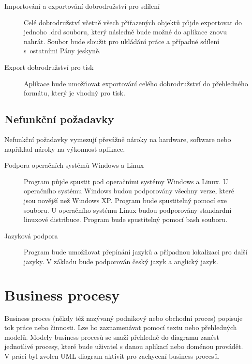 \documentclass[thesis=B,czech]{resources/FITthesis}[2012/06/26]
\begin{document}
\begin{description}
\item[Importování a exportování dobrodružství pro sdílení] Celé dobrodružství včetně všech přiřazených objektů půjde exportovat do jednoho .drd souboru, který následně bude možné do aplikace znovu nahrát. Soubor bude sloužit pro ukládání práce a případné sdílení s~ostatními Pány jeskyně.

\item[Export dobrodružství pro tisk] Aplikace bude umožňovat exportování celého dobrodružství do přehledného formátu, který je vhodný pro tisk. 
\end{description}

\subsection{Nefunkční požadavky}\label{sec:nefunkcni_pozadavky}
Nefunkční požadavky vymezují převážně nároky na hardware, software nebo například nároky na výkonnost aplikace. 
\begin{description}
\item[Podpora operačních systémů Windows a Linux] Program půjde spustit pod operačními systémy Windows a Linux. U operačního systému Windows budou podporovány všechny verze, které jsou novější než Windows XP. Program bude spustitelný pomocí exe souboru. U operačního systému Linux budou podporovány standardní linuxové distribuce. Program bude spustitelný pomocí bash souboru.

\item[Jazyková podpora] Program bude umožňovat přepínání jazyků a případnou lokalizaci pro další jazyky. V základu bude podporován český jazyk a anglický jazyk.
\end{description}
	\section{Business procesy}
Business proces (někdy též nazývaný podnikový nebo obchodní proces) popisuje tok práce nebo činnosti. Lze ho zaznamenávat pomocí textu nebo přehledných modelů. Modely business procesů se snaží přehledně do diagramu zanést jednotlivé procesy, které bude uživatel s danou aplikací nebo doménou provádět. V práci byl zvolen UML diagram aktivit pro zachycení business procesů.
\end{document}
